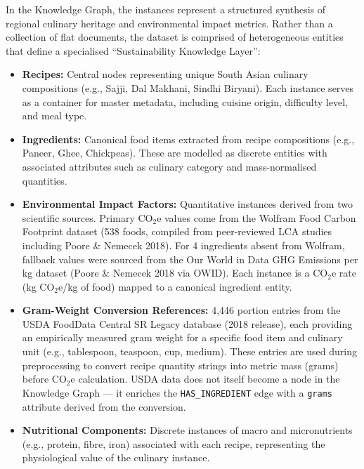 \documentclass{article}
\begin{document}
In the Knowledge Graph, the instances represent a structured synthesis of regional culinary heritage and environmental impact metrics. Rather than a collection of flat documents, the dataset is comprised of heterogeneous entities that define a specialised ``Sustainability Knowledge Layer'':
\begin{itemize}
    \item \textbf{Recipes:} Central nodes representing unique South Asian culinary compositions (e.g., Sajji, Dal Makhani, Sindhi Biryani). Each instance serves as a container for master metadata, including cuisine origin, difficulty level, and meal type.
    \item \textbf{Ingredients:} Canonical food items extracted from recipe compositions (e.g., Paneer, Ghee, Chickpeas). These are modelled as discrete entities with associated attributes such as culinary category and mass-normalised quantities.
    \item \textbf{Environmental Impact Factors:} Quantitative instances derived from two scientific sources. Primary CO$_2$e values come from the Wolfram Food Carbon Footprint dataset (538 foods, compiled from peer-reviewed LCA studies including Poore \& Nemecek 2018). For 4 ingredients absent from Wolfram, fallback values were sourced from the Our World in Data GHG Emissions per kg dataset (Poore \& Nemecek 2018 via OWID). Each instance is a CO$_2$e rate (kg CO$_2$e/kg of food) mapped to a canonical ingredient entity.
    \item \textbf{Gram-Weight Conversion References:} 4,446 portion entries from the USDA FoodData Central SR Legacy database (2018 release), each providing an empirically measured gram weight for a specific food item and culinary unit (e.g., tablespoon, teaspoon, cup, medium). These entries are used during preprocessing to convert recipe quantity strings into metric mass (grams) before CO$_2$e calculation. USDA data does not itself become a node in the Knowledge Graph --- it enriches the \texttt{HAS\_INGREDIENT} edge with a \texttt{grams} attribute derived from the conversion.
    \item \textbf{Nutritional Components:} Discrete instances of macro and micronutrients (e.g., protein, fibre, iron) associated with each recipe, representing the physiological value of the culinary instance.
\end{itemize}
\end{document}
